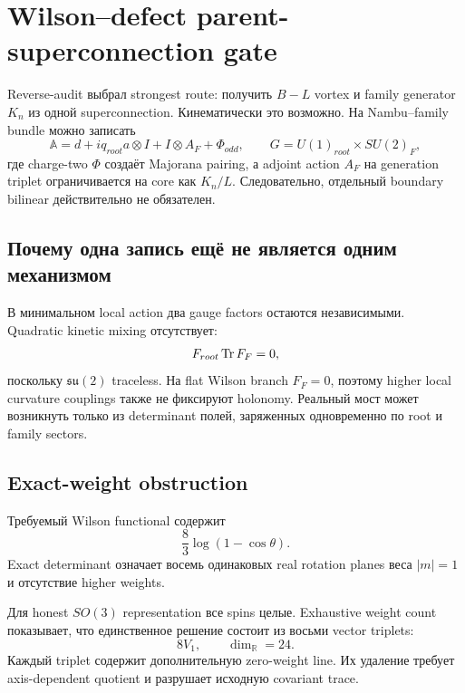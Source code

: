 \chapter{Wilson--defect parent-superconnection gate}

Reverse-audit выбрал strongest route: получить \(B-L\) vortex и family
generator \(K_n\) из одной superconnection. Кинематически это возможно.
На Nambu--family bundle можно записать
\begin{equation}
 \mathbb A=d+iq_{root}a\otimes I+I\otimes A_F+\Phi_{odd},
 \qquad
 G=U(1)_{root}\times SU(2)_F,
\end{equation}
где charge-two \(\Phi\) создаёт Majorana pairing, а adjoint action
\(A_F\) на generation triplet ограничивается на core как \(K_n/L\).
Следовательно, отдельный boundary bilinear действительно не обязателен.

\section{Почему одна запись ещё не является одним механизмом}

В минимальном local action два gauge factors остаются независимыми.
Quadratic kinetic mixing отсутствует:
\begin{equation}
 F_{root}\operatorname{Tr} F_F=0,
\end{equation}
поскольку \(\mathfrak{su}(2)\) traceless. На flat Wilson branch
\(F_F=0\), поэтому higher local curvature couplings также не фиксируют
holonomy. Реальный мост может возникнуть только из determinant полей,
заряженных одновременно по root и family sectors.

\section{Exact-weight obstruction}

Требуемый Wilson functional содержит
\begin{equation}
 \frac83\log(1-\cos\theta).
\end{equation}
Exact determinant означает восемь одинаковых real rotation planes веса
\(|m|=1\) и отсутствие higher weights.

Для honest \(SO(3)\) representation все spins целые. Exhaustive weight
count показывает, что единственное решение состоит из восьми vector
triplets:
\begin{equation}
 8V_1,
 \qquad
 \dim_{\mathbb R}=24.
\end{equation}
Каждый triplet содержит дополнительную zero-weight line. Их удаление
требует axis-dependent quotient и разрушает исходную covariant trace.

